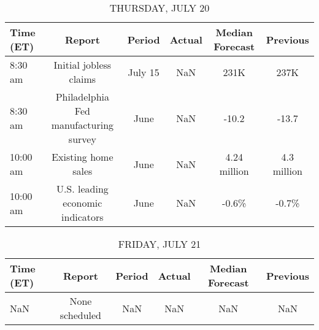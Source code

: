 \documentclass{article}%
\begin{document}
%


\begin{table}[htbp]%
\caption{THURSDAY, JULY 20}%
\centering%
\begin{adjustbox}{width=1\textwidth}%
\begin{tabular}{lccccc}
\toprule
Time (ET) &                                Report &  Period & Actual & Median Forecast &    Previous \\
\midrule
  8:30 am &                Initial jobless claims & July 15 &    NaN &            231K &        237K \\
  8:30 am & Philadelphia Fed manufacturing survey &    June &    NaN &           -10.2 &       -13.7 \\
 10:00 am &                   Existing home sales &    June &    NaN &    4.24 million & 4.3 million \\
 10:00 am &      U.S. leading economic indicators &    June &    NaN &           -0.6\% &       -0.7\% \\
\bottomrule
\end{tabular}
%
\end{adjustbox}%
\end{table}

%


\begin{table}[htbp]%
\caption{FRIDAY, JULY 21}%
\centering%
\begin{adjustbox}{width=1\textwidth}%
\begin{tabular}{lccccc}
\toprule
Time (ET) &         Report & Period & Actual & Median Forecast & Previous \\
\midrule
      NaN & None scheduled &    NaN &    NaN &             NaN &      NaN \\
\bottomrule
\end{tabular}
%
\end{adjustbox}%
\end{table}
\end{document}
